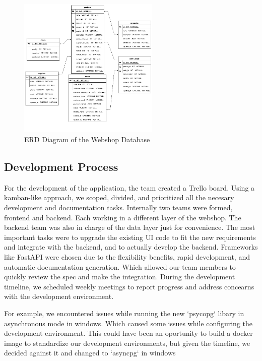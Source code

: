 \documentclass{llncs}
\begin{document}
\begin{figure}[H]
    \centering
    \includegraphics[width=0.6\textwidth]{../diagrams/webshop_erd.drawio.png}
    \caption{ERD Diagram of the Webshop Database}
    \label{fig:erd_webshop}
\end{figure}

\subsection{Development Process}

For the development of the application, the team created a Trello board. Using a kamban-like approach, we scoped,
divided, and prioritized all the necesary development and documentation tasks. Internally two teams were formed, frontend and backend.
Each working in a different layer of the webshop. The backend team was also in charge of the data layer just for convenience.
The most important tasks were to upgrade the existing UI code to fit the new requirements and integrate with the backend, and to actually develop the backend.
Frameworks like FastAPI were chosen due to the flexibility benefits, rapid development, and automatic documentation generation. Which allowed our team members to quickly review the spec and make the integration.
During the development timeline, we scheduled weekly meetings to report progress and address concearns with the development environment.

For example, we encountered issues while running the new `psycopg` libary in asynchronous mode in windows. Which caused some issues while configuring the development environment.
This could have been an oportunity to build a docker image to standardize our development environments, but given the timeline, we decided against it and changed to `asyncpg` in windows \\
\end{document}
